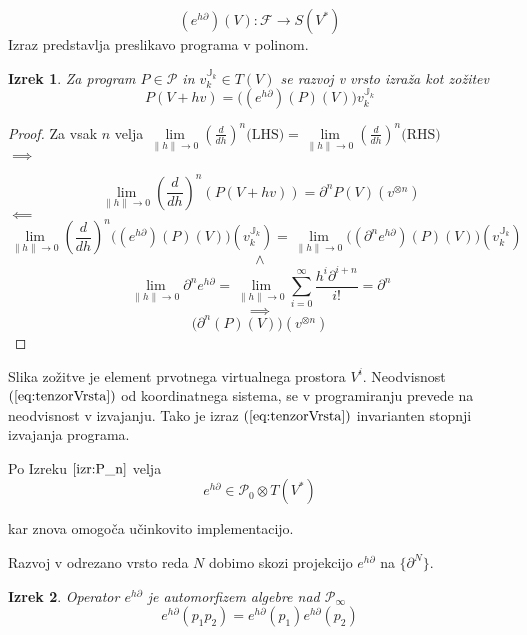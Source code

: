 \documentclass{article}
\newcommand{\JJ}{\mathbb{J}}
\newcommand{\F}{\mathcal{F}}
\newcommand{\dP}{\mathcal{P}}
\newcommand{\D}{\partial}
\newtheorem{izrek}{Izrek}[section]
\begin{document}
 \begin{equation}
 	(e^{h\D})(V): \F\to S(V^*)
 \end{equation}
 Izraz predstavlja preslikavo programa v polinom.
 
\begin{izrek}\label{izr:e^d}
	Za program $P\in\dP$ in $v^{\JJ_k}_{k}\in T(V)$ se razvoj v vrsto izraža kot zožitev\\
	\begin{equation}\label{eq:tenzorVrsta}
	P(V+hv) = \Big((e^{h\D})(P)(V)\Big)v^{\JJ_k}_{k}
	\end{equation}
\end{izrek}
 
 \begin{proof}
 Za vsak $n$ velja $\lim\limits_{\lVert h\rVert\to 0}(\frac{d}{dh})^n\text{(LHS)}=\lim\limits_{\lVert h\rVert\to 0}(\frac{d}{dh})^n\text{(RHS)}$\\
 $\implies$
 
 $$\lim\limits_{\lVert h\rVert\to 0}(\frac{d}{dh})^n(P(V+hv))=\D^n P(V)(v^{\otimes n})$$
 $\impliedby$
 $$\lim\limits_{\lVert h\rVert\to 0}(\frac{d}{dh})^n\Big((e^{h\D})(P)(V)\Big)(v^{\JJ_k}_{k})=\lim\limits_{\lVert h\rVert\to 0}\Big((\D^n e^{h\D})(P)(V)\Big)(v^{\JJ_k}_{k})$$
 $$\land$$
 $$\lim\limits_{\lVert h\rVert\to 0}\D^ne^{h\D}=\lim\limits_{\lVert h\rVert\to 0}\sum\limits_{i=0}^{\infty}\frac{h^i\D^{i+n}}{i!}=\D^n$$
 $$\implies$$
 $$\Big(\D^n(P)(V)\Big)(v^{\otimes n})$$
 \end{proof}
  
 Slika zožitve je element prvotnega virtualnega prostora $V^i$. Neodvisnost $(\ref{eq:tenzorVrsta})$ od koordinatnega sistema, se v programiranju prevede na neodvisnost v izvajanju. Tako je izraz $(\ref{eq:tenzorVrsta})$ invarianten stopnji izvajanja programa.   
 
 Po Izreku $\ref{izr:P_n}$ velja
     \begin{equation}
     	e^{h\D}\in\dP_0\otimes T(V^*)
     \end{equation} 
     
kar znova omogoča učinkovito implementacijo.

 Razvoj v odrezano vrsto reda $N$ dobimo skozi projekcijo $e^{h\D}$ na $\{\D^N \}$. 
 
 \begin{izrek}
 Operator $e^{h\D}$ je automorfizem algebre nad $\dP_\infty$
 \begin{equation}
 	e^{h\D}(p_1p_2)=e^{h\D}(p_1)e^{h\D}(p_2)
 \end{equation}
 \end{izrek}
 
\end{document}
